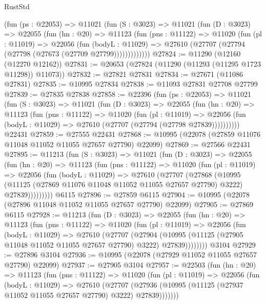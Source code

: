 \begin{lexlean}{RustStd}
\begin{coremodule}
      (fun (ps : @22053) =>
      @11021
        (fun (S : @3023) =>
        @11021
          (fun (D : @3023) =>
          @22055
            (fun (hn : @20) =>
            @11123
              (fun (pns : @11122) =>
              @11020
                (fun (pl : @11019) =>
                @22056
                  (fun (bodyL : @11029) =>
                  @27610 (@27707 (@27794 (@27798 (@27673 (@27709 @27799)))))))))))))
@27824 := @11290 (@12160 (@12270 @12162))
@27831 := @20653 (@27824 (@11290 (@11293 (@11295 @1723 @11298)) @11073))
@27832 := @27821 @27831
@27834 := @27671 (@11086 @27831)
@27835 := @10995 @27834
@27838 := @11093 @27831 @27708 @27799
@27839 := @27835 @27838
@27858 := @22396
    (fun (ps : @22053) =>
    @11021
      (fun (S : @3023) =>
      @11021
        (fun (D : @3023) =>
        @22055
          (fun (hn : @20) =>
          @11123
            (fun (pns : @11122) =>
            @11020
              (fun (pl : @11019) =>
              @22056 (fun (bodyL : @11029) => @27610 (@27707 (@27794 (@27798 @27839))))))))))
    @22431
@27859 := @27555 @22431
@27868 := @10995 (@22078 (@27859 @11076 @11048 @11052 @11055 @27657 @27790) @22099)
@27869 := @27566 @22431
@27895 := @11213
    (fun (S : @3023) =>
    @11021
      (fun (D : @3023) =>
      @22055
        (fun (hn : @20) =>
        @11123
          (fun (pns : @11122) =>
          @11020
            (fun (pl : @11019) =>
            @22056
              (fun (bodyL : @11029) =>
              @27610
                (@27707
                  (@27868
                    (@10995
                      (@11125 (@27869 @11076 @11048 @11052 @11055 @27657 @27790) @3222)
                      @27839)))))))))
    @6115
@27896 := @27859 @6115
@27904 := @10995 (@22078 (@27896 @11048 @11052 @11055 @27657 @27790) @22099)
@27905 := @27869 @6115
@27928 := @11213
    (fun (D : @3023) =>
    @22055
      (fun (hn : @20) =>
      @11123
        (fun (pns : @11122) =>
        @11020
          (fun (pl : @11019) =>
          @22056
            (fun (bodyL : @11029) =>
            @27610
              (@27707
                (@27904
                  (@10995 (@11125 (@27905 @11048 @11052 @11055 @27657 @27790) @3222) @27839))))))))
    @3104
@27929 := @27896 @3104
@27936 := @10995 (@22078 (@27929 @11052 @11055 @27657 @27790) @22099)
@27937 := @27905 @3104
@27957 := @22503
    (fun (hn : @20) =>
    @11123
      (fun (pns : @11122) =>
      @11020
        (fun (pl : @11019) =>
        @22056
          (fun (bodyL : @11029) =>
          @27610
            (@27707
              (@27936 (@10995 (@11125 (@27937 @11052 @11055 @27657 @27790) @3222) @27839)))))))

\end{coremodule}
\end{lexlean}
